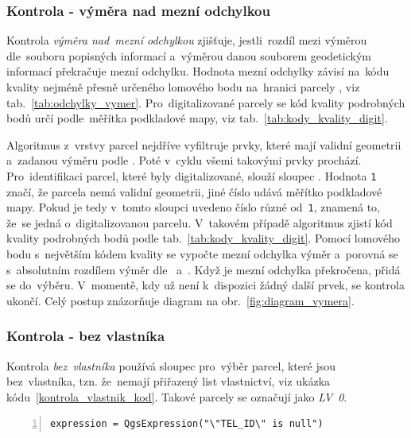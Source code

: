 \subsubsection{Kontrola - výměra nad mezní odchylkou}
\label{kontrola_vymera}

Kontrola \textit{výměra nad~mezní odchylkou} zjišťuje, jestli~rozdíl
mezi výměrou dle~souboru popisných informací a~výměrou danou souborem
geodetickým informací překračuje mezní odchylku. Hodnota mezní
odchylky závisí na~kódu kvality nejméně přesně určeného lomového bodu
na~hranici parcely \citep{vyhlaska_357}, viz
tab.~\ref{tab:odchylky_vymer}. Pro~digitalizované parcely se kód
kvality podrobných bodů určí podle~měřítka podkladové mapy, viz
tab.~\ref{tab:kody_kvality_digit}.

Algoritmus z~vrstvy parcel nejdříve vyfiltruje prvky, které mají
validní geometrii a~zadanou výměru podle . Poté v~cyklu všemi
takovými prvky prochází. Pro~identifikaci parcel, které byly
digitalizované, slouží sloupec
\texttt{}. Hodnota \texttt{1} značí,
že parcela nemá validní geometrii, jiné číslo udává měřítko podkladové
mapy. Pokud je tedy v~tomto sloupci uvedeno číslo různé od~\texttt{1},
znamená to, že~se jedná o~digitalizovanou parcelu. V~takovém případě
algoritmus zjistí kód kvality podrobných bodů podle
tab.~\ref{tab:kody_kvality_digit}. Pomocí lomového bodu s~největším
kódem kvality se vypočte mezní odchylka výměr a~porovná se
s~absolutním rozdílem výměr dle~ a~. Když je mezní
odchylka překročena, přidá se do~výběru. V~momentě, kdy už není
k~dispozici žádný další prvek, se kontrola ukončí. Celý postup
znázorňuje diagram na obr.~\ref{fig:diagram_vymera}.

\subsubsection{Kontrola - bez vlastníka}
\label{kontrola_bez_vlastnika}

Kontrola \textit{bez~vlastníka} používá sloupec
\texttt{} pro~výběr parcel, které jsou
bez~vlastníka, tzn. že~nemají přiřazený list vlastnictví, viz ukázka
kódu~\ref{kontrola_vlastnik_kod}. Takové parcely se označují jako
\textit{LV~0}.

{\scriptsize
\begin{lstlisting}[style=python, caption={Kontrola
\textit{bez~vlastníka}~– vzorec pro~výběr prvků}, captionpos=b,
label=kontrola_vlastnik_kod, backgroundcolor = \color{light-gray},
numbers=left] expression = QgsExpression("\"TEL_ID\" is null")
\end{lstlisting}}

